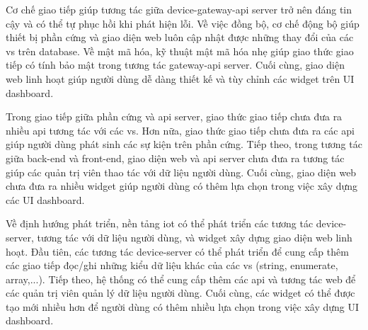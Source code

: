 Cơ chế giao tiếp giúp tương tác giữa device-gateway-\acrshort{api} server trở nên đáng tin cậy và có thể tự phục hồi khi phát hiện lỗi.
Về việc đồng bộ, cơ chế động bộ giúp thiết bị phần cứng và giao diện web luôn cập nhật được những thay đổi của các \acrshort{vs} trên database.
Về mật mã hóa, kỹ thuật mật mã hóa nhẹ giúp giao thức giao tiếp có tính bảo mật trong tương tác gateway-\acrshort{api} server.
Cuối cùng, giao diện web linh hoạt giúp người dùng dễ dàng thiết kế và tùy chỉnh các widget trên UI dashboard.

Trong giao tiếp giữa phần cứng và \acrshort{api} server, giao thức giao tiếp chưa đưa ra nhiều \acrshort{api} tương tác với các \acrshort{vs}. Hơn nữa, giao thức giao tiếp chưa đưa ra các \acrshort{api} giúp người dùng phát sinh các sự kiện trên phần cứng.
Tiếp theo, trong tương tác giữa back-end và front-end, giao diện web và \acrshort{api} server chưa đưa ra tương tác giúp các quản trị viên thao tác với dữ liệu người dùng.
Cuối cùng, giao diện web chưa đưa ra nhiều widget giúp người dùng có thêm lựa chọn trong việc xây dựng các UI dashboard.

Về định hướng phát triển, nền tảng \acrshort{iot} có thể phát triển các tương tác device-server, tương tác với dữ liệu người dùng, và widget xây dựng giao diện web linh hoạt.
Đầu tiên, các tương tác device-server có thể phát triển để cung cấp thêm các giao tiếp đọc/ghi những kiểu dữ liệu khác của các \acrshort{vs} (string, enumerate, array,...).
Tiếp theo, hệ thống có thể cung cấp thêm các \acrshort{api} và tương tác web để các quản trị viên quản lý dữ liệu người dùng.
Cuối cùng, các widget có thể được tạo mới nhiều hơn để người dùng có thêm nhiều lựa chọn trong việc xây dựng UI dashboard.